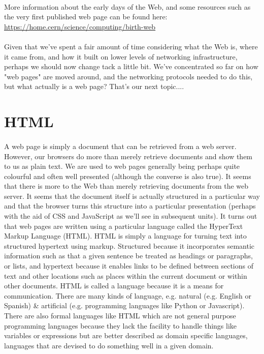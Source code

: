 \paragraph{} More information about the early days of the Web, and some resources such as the very first published web page can be found here:\\
	\url{https://home.cern/science/computing/birth-web}
\paragraph{} Given that we've spent a fair amount of time considering what the Web is, where it came from, and how it built on lower levels of networking infrastructure, perhaps we should now change tack a little bit. We've concentrated so far on how "web pages" are moved around, and the networking protocols needed to do this, but what actually is a  web page? That's our next topic....


\section{HTML}
\paragraph{} A web page is simply a document that can be retrieved from a web server. However, our browsers do more than merely retrieve documents and show them to us as plain text. We are used to web pages generally being perhaps quite colourful and often well presented (although the converse is also true). It seems that there is more to the Web than merely retrieving documents from the web server. It seems that the document itself is actually structured in a particular way and that the browser turns this structure into a particular presentation (perhaps with the aid of CSS and JavaScript as we'll see in subsequent units). It turns out that web pages are written using a particular language called the HyperText Markup Language (HTML). HTML is simply a language for turning text into structured hypertext using markup. Structured because it incorporates semantic information such as that a given sentence be treated as headings or paragraphs, or lists, and hypertext because it enables links to be defined between sections of text and other locations such as places within the current document or within other documents. HTML is called a language because it is a means for communication. There are many kinds of language, e.g. natural (e.g. English or Spanish) \& artificial (e.g. programming languages like Python or Javascript). There are also formal languages like HTML which are not general purpose programming languages because they lack the facility to handle things like variables or expressions but are better described as domain specific languages, languages that are devised to do something well in a given domain.
